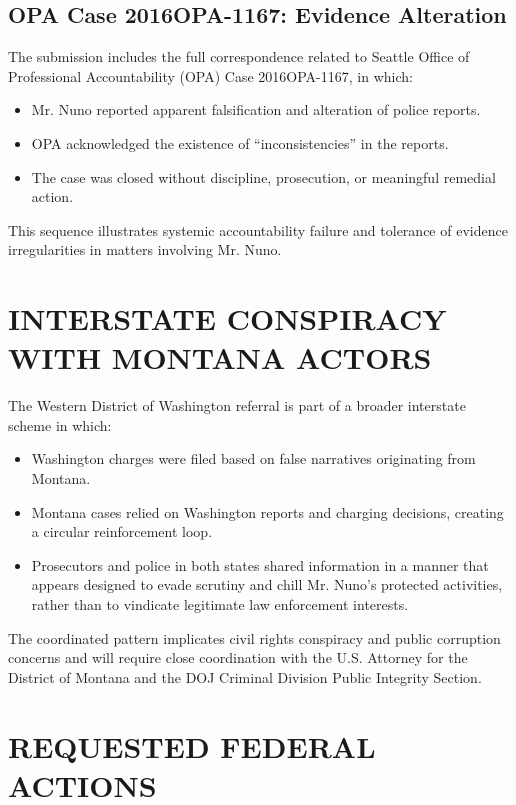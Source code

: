 \documentclass[12pt,oneside]{article}
\begin{document}
\begin{flushleft}
\subsection*{OPA Case 2016OPA-1167: Evidence Alteration}

The submission includes the full correspondence related to Seattle Office of Professional Accountability (OPA) Case 2016OPA-1167, in which:

\begin{itemize}
\item Mr. Nuno reported apparent falsification and alteration of police reports.
\item OPA acknowledged the existence of ``inconsistencies'' in the reports.
\item The case was closed without discipline, prosecution, or meaningful remedial action.
\end{itemize}

This sequence illustrates systemic accountability failure and tolerance of evidence irregularities in matters involving Mr. Nuno.

\section*{INTERSTATE CONSPIRACY WITH MONTANA ACTORS}

The Western District of Washington referral is part of a broader interstate scheme in which:

\begin{itemize}
\item Washington charges were filed based on false narratives originating from Montana.
\item Montana cases relied on Washington reports and charging decisions, creating a circular reinforcement loop.
\item Prosecutors and police in both states shared information in a manner that appears designed to evade scrutiny and chill Mr. Nuno's protected activities, rather than to vindicate legitimate law enforcement interests.
\end{itemize}

The coordinated pattern implicates civil rights conspiracy and public corruption concerns and will require close coordination with the U.S. Attorney for the District of Montana and the DOJ Criminal Division Public Integrity Section.

\section*{REQUESTED FEDERAL ACTIONS}


\end{flushleft}
\end{document}
